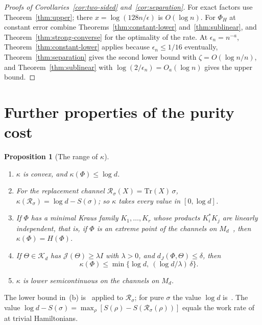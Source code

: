 \documentclass[11pt,a4paper]{article}
\theoremstyle{plain}
\newtheorem{proposition}[theorem]{Proposition}
\theoremstyle{definition}
\theoremstyle{remark}
\newcommand{\dJ}{d_J}
\begin{document}
\begin{proof}[Proofs of Corollaries~\ref{cor:two-sided} and~\ref{cor:separation}]
For exact factors use Theorem~\ref{thm:upper}; there $x=\log(128n/\epsilon)$ is $O(\log n)$. For $\Phi_H$ at constant error
combine Theorems~\ref{thm:constant-lower} and~\ref{thm:sublinear}, and Theorem~\ref{thm:strong-converse} for the optimality of the rate.
At $\epsilon_n=n^{-a}$, Theorem~\ref{thm:constant-lower} applies because $\epsilon_n\le1/16$ eventually,
Theorem~\ref{thm:separation} gives the second lower bound with $\zeta=O(\log n/n)$, and Theorem~\ref{thm:sublinear} with
$\log(2/\epsilon_n)=O_a(\log n)$ gives the upper bound.
\end{proof}


\section{Further properties of the purity cost}\label{app:purity}


\begin{proposition}[The range of $\kappa$]\label{prop:kappa-range}
\begin{enumerate}[label=(\alph*)]
\item $\kappa$ is convex, and $\kappa(\Phi)\le\log d$.
\item For the replacement channel $\mathcal R_\sigma(X)=\mathrm{Tr}(X)\,\sigma$, $\kappa(\mathcal R_\sigma)=\log d-S(\sigma)$; so $\kappa$ takes every value in
$[0,\log d]$.
\item If $\Phi$ has a minimal Kraus family $K_1,\dots,K_r$ whose products $K_i^*K_j$ are linearly independent, that is, if $\Phi$ is an extreme
point of the channels on $M_d$~\cite{Choi1975}, then $\kappa(\Phi)=H(\Phi)$.
\item If $\Theta\in\mathcal K_d$ has $\mathcal J(\Theta)\ge\lambda I$ with $\lambda>0$, and $\dJ(\Phi,\Theta)\le\delta$, then
\[
\kappa(\Phi)\le\min\{\log d,\ (\log d/\lambda)\,\delta\}.
\]
\item $\kappa$ is lower semicontinuous on the channels on $M_d$.
\end{enumerate}
\end{proposition}

The lower bound in~(b) is~\cite[Proposition~7.4]{Douglas2026closed} applied to $\mathcal R_\sigma$; for pure $\sigma$ the value $\log d$
is~\cite[Proposition~7.3]{Douglas2026closed}. The value $\log d-S(\sigma)=\max_\rho[S(\rho)-S(\mathcal R_\sigma(\rho))]$ equals the work rate
of~\cite{FBB2019} at trivial Hamiltonians.
\end{document}
